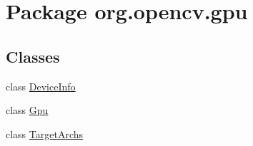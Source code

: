 \hypertarget{namespaceorg_1_1opencv_1_1gpu}{}\section{Package org.\+opencv.\+gpu}
\label{namespaceorg_1_1opencv_1_1gpu}
\subsection*{Classes}
\begin{DoxyCompactItemize}
\item 
class \mbox{\hyperlink{classorg_1_1opencv_1_1gpu_1_1_device_info}{Device\+Info}}
\item 
class \mbox{\hyperlink{classorg_1_1opencv_1_1gpu_1_1_gpu}{Gpu}}
\item 
class \mbox{\hyperlink{classorg_1_1opencv_1_1gpu_1_1_target_archs}{Target\+Archs}}
\end{DoxyCompactItemize}
